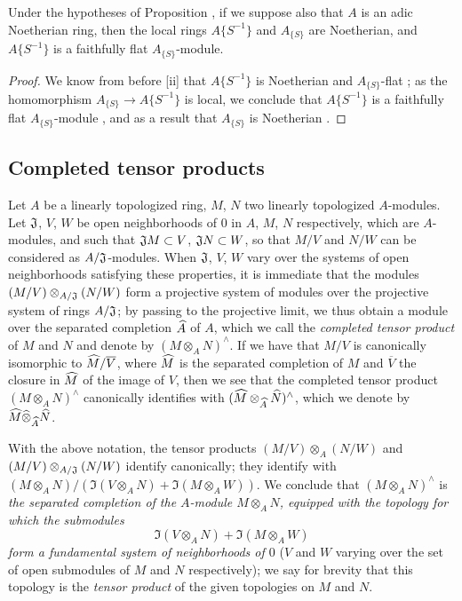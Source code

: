 \begin{cor}[7.6.18]
\label{0.7.6.18}
Under the hypotheses of Proposition , if we suppose also that
$A$ is an adic Noetherian ring, then the local rings $A\{S^{-1}\}$ and $A_{\{S\}}$ are Noetherian,
and $A\{S^{-1}\}$ is a faithfully flat $A_{\{S\}}$-module.
\end{cor}

\begin{proof}
\label{proof-0.7.6.18}
We know from before [ii] that $A\{S^{-1}\}$ is Noetherian and
$A_{\{S\}}$-flat ; as the homomorphism $A_{\{S\}}\to A\{S^{-1}\}$
is local, we conclude that $A\{S^{-1}\}$ is a faithfully flat $A_{\{S\}}$-module
, and as a result that $A_{\{S\}}$ is Noetherian .
\end{proof}

\subsection{Completed tensor products}
\label{subsection-completed-tensor-prods}

\begin{env}[7.7.1]
\label{0.7.1.1}
Let $A$ be a linearly topologized ring, $M$, $N$ two linearly topologized $A$-modules. Let
$\mathfrak{J}$, $V$, $W$ be open neighborhoods of $0$ in $A$, $M$, $N$ respectively, which are
$A$-modules, and such that $\mathfrak{J}M\subset V$, $\mathfrak{J}N\subset W$, so that
$M/V$ and $N/W$ can be considered as $A/\mathfrak{J}$-modules. When $\mathfrak{J}$, $V$, $W$
vary over the systems of open neighborhoods satisfying these properties, it is immediate that the
modules $(M/V)\otimes_{A/\mathfrak{J}}(N/W)$ form a projective system of modules
over the projective system of rings $A/\mathfrak{J}$; by passing to the projective limit, we
thus obtain a module over the separated completion $\widehat{A}$ of $A$, which we call the
\emph{completed tensor product} of $M$ and $N$ and denote by $(M\otimes_A N)^\wedge$. If we have
that $M/V$ is canonically isomorphic to $\widehat{M}/\overline{V}$, where $\widehat{M}$ is the
separated completion of $M$ and $\overline{V}$ the closure in $\widehat{M}$ of the image of $V$,
then we see that the completed tensor product $(M\otimes_A N)^\wedge$ canonically identifies with
$(\widehat{M}\otimes_{\widehat{A}}\widehat{N})^\wedge$, which we denote by
$\widehat{M}\widehat{\otimes}_{\widehat{A}}\widehat{N}$.
\end{env}

\begin{env}[7.7.2]
\label{0.7.7.2}
With the above notation, the tensor products $(M/V)\otimes_A(N/W)$ and
$(M/V)\otimes_{A/\mathfrak{J}}(N/W)$ identify canonically; they identify with
$(M\otimes_A N)/(\Im(V\otimes_A N)+\Im(M\otimes_A W))$. We conclude that $(M\otimes_A N)^\wedge$
is \emph{the separated completion of the $A$-module $M\otimes_A N$, equipped with the topology for
which the submodules
\[
  \Im(V\otimes_A N)+\Im(M\otimes_A W)
\]
form a fundamental system of neighborhoods of $0$} ($V$ and $W$ varying over the set of open submodules
of $M$ and $N$ respectively); we say for brevity that this topology is the \emph{tensor product} of
the given topologies on $M$ and $N$.
\end{env}

